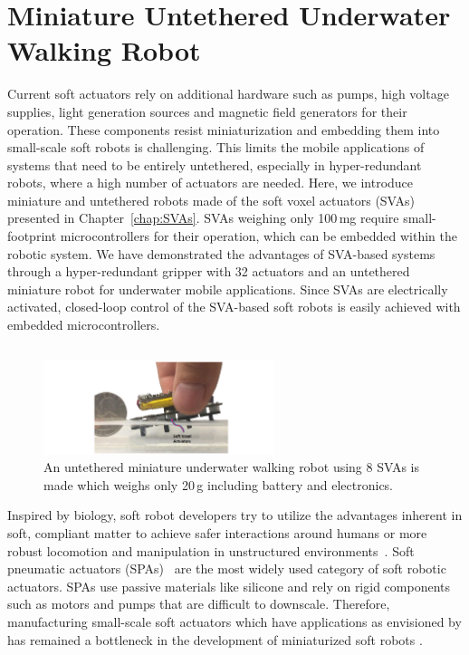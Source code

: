 \graphicspath{{Images/untetheredWalker/}}

\chapter{Miniature Untethered Underwater Walking Robot}
\label{chap:untetheredWalker}
Current soft actuators rely on additional hardware such as pumps, high voltage supplies, light generation sources and magnetic field generators for their operation. 
These components resist miniaturization and embedding them into small-scale soft robots is challenging. This limits the mobile applications of systems that need to be entirely untethered, especially in hyper-redundant robots, where a high number of actuators are needed. Here, we introduce miniature and untethered robots made of the soft voxel actuators (SVAs) presented in Chapter~\ref{chap:SVAs}. SVAs weighing only 100\,mg require small-footprint microcontrollers for their operation, which can be embedded within the robotic system. We have demonstrated the advantages of SVA-based systems through a hyper-redundant gripper with 32 actuators and an untethered miniature robot for underwater mobile applications. Since SVAs are electrically activated, closed-loop control of the SVA-based soft robots is easily achieved with embedded microcontrollers.
\section{}

\begin{figure}[!ht]
\centering
\includegraphics[width=0.6\textwidth]{untWalker.pdf}
    \caption[]{An untethered miniature underwater walking robot using 8 SVAs is made which weighs only 20\,g including battery and electronics.}
    \label{fig:untWalker}
\end{figure}

Inspired by biology, soft robot developers try to utilize the advantages inherent in soft, compliant matter to achieve safer interactions around humans or more robust locomotion and manipulation in unstructured environments~\cite{martinez2013,laschi2012,tolley2014b,AdamBilodeau2015}.  
Soft pneumatic actuators (SPAs)~\cite{Gorissen2017, Branyan2018} are the most widely used category of soft robotic actuators. SPAs use passive materials like silicone and rely on rigid components such as motors and pumps that are difficult to downscale. Therefore, manufacturing small-scale soft actuators which have applications as envisioned by \cite{Hines2017} has remained a bottleneck in the development of miniaturized soft robots \cite{Majidi2019}. 

